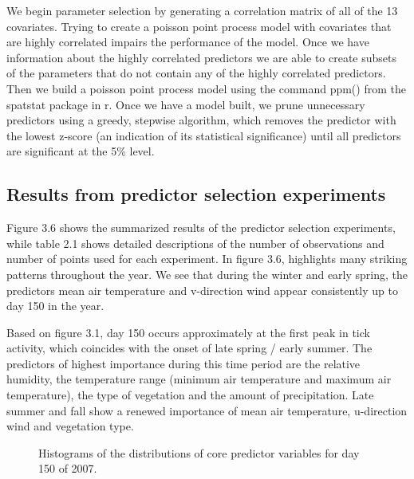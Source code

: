 \noindent We begin parameter selection by generating a correlation matrix of all of the 13 covariates. Trying to create a poisson point process model with covariates that are highly correlated impairs the performance of the model. Once we have information about the highly correlated predictors we are able to create subsets of the parameters that do not contain any of the highly correlated predictors. Then we build a poisson point process model using the command ppm() from the spatstat package in r. Once we have a model built, we prune unnecessary predictors using a greedy, stepwise algorithm, which removes the predictor with the lowest z-score (an indication of its statistical significance) until all predictors are significant at the 5\% level.  \newline

\subsection{ Results from predictor selection experiments}

Figure 3.6 shows the summarized results of the predictor selection experiments, while table 2.1 shows detailed descriptions of the number of observations and number of points used for each experiment. In figure 3.6, highlights many striking patterns throughout the year. We see that during the winter and early spring, the predictors mean air temperature and v-direction wind appear consistently up to day 150 in the year. \newline

\noindent Based on figure 3.1, day 150 occurs approximately at the first peak in tick activity, which coincides with the onset of late spring / early summer. The predictors of highest importance during this time period are the relative humidity, the temperature range (minimum air temperature and maximum air temperature), the type of vegetation and the amount of precipitation. Late summer and fall show a renewed importance of mean air temperature, u-direction wind and vegetation type.  \newline

\begin{figure} [!ht]
\centerline{}
\caption{Histograms of the distributions of core predictor  variables for day 150 of 2007. }
\label{fig6}
\end{figure}


